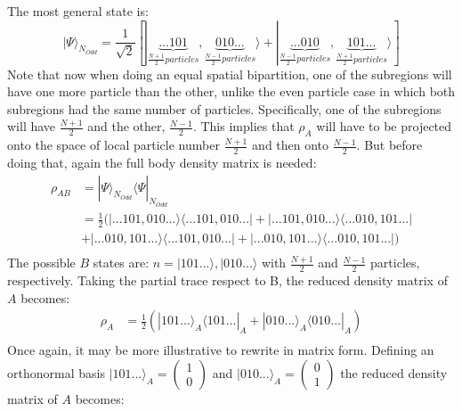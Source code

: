 	The most general state is:
	\begin{equation}
	| \Psi \rangle_{N_{Odd}} = \frac{1}{\sqrt{2}} [|\underbrace{...101}_{\frac{N+1}{2} particles}, \underbrace{010...}_{\frac{N-1}{2} particles} \rangle + |\underbrace{...010}_{\frac{N-1}{2} particles}, \underbrace{101...}_{\frac{N+1}{2} particles} \rangle ]
	\end{equation}
	Note that now when doing an equal spatial bipartition, one of the subregions will have one more particle than the other, unlike the even particle case in which both subregions had the same number of particles. Specifically, one of the subregions will have $\frac{N+1}{2}$ and the other, $\frac{N-1}{2}$. This implies that $\rho_{A}$ will have to be projected onto the space of local particle number $\frac{N+1}{2}$ and then onto $\frac{N-1}{2}$. But before doing that, again the full body density matrix is needed:
	\begin{equation}
	\begin{aligned}
\rho_{AB} &= | \Psi \rangle_{N_{Odd}} \langle \Psi |_{N_{Odd}} \\
&= \frac{1}{2} ( |...101,010... \rangle \langle ...101,010... | +  |...101,010... \rangle \langle ...010,101... |  \\
&+  |...010,101... \rangle \langle ...101,010... | + |...010,101... \rangle \langle ...010,101... | )\\
	\end{aligned}
	\end{equation}
The possible $B$ states are: $n = | 101... \rangle, | 010... \rangle$ with $\frac{N+1}{2}$ and $\frac{N-1}{2}$ particles, respectively. Taking the partial trace respect to B, the reduced density matrix of $A$ becomes:
	\begin{equation}
\begin{aligned}
\rho_{A} &= \frac{1}{2} ( | 101... \rangle_{A} \langle 101... |_{A} +  | 010... \rangle_{A} \langle 010... |_{A} )\\
\end{aligned}
\end{equation}
%
Once again, it may be more illustrative to rewrite in matrix form. Defining an orthonormal basis $| 101... \rangle_{A}  = \begin{pmatrix} 1 \\ 0\end{pmatrix}$ and $| 010... \rangle_{A}  = \begin{pmatrix} 0 \\ 1\end{pmatrix}$ the reduced density matrix of $A$ becomes:
